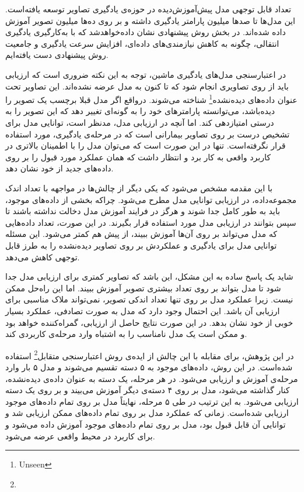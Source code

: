 تعداد قابل توجهی مدل پیش‌آموزش‌دیده در حوزه‌ی یادگیری تصاویر توسعه یافته‌است.
این مدل‌ها  تا صد‌ها میلیون پارامتر یادگیری داشته و بر روی ده‌ها میلیون تصویر آموزش داده شده‌اند. 
در بخش روش پیشنهادی نشان داده‌خواهد‌شد که با به‌کارگیری یادگیری انتقالی، چگونه به کاهش نیازمندی‌های داده‌ای، افزایش سرعت یادگیری و جامعیت روش پیشنهادی دست یافته‌ایم.


در اعتبار‌سنجی مدل‌های یادگیری ماشین، توجه به این نکته ضروری است که ارزیابی باید از روی تصاویری انجام شود که تا کنون به مدل عرضه نشده‌اند.
این تصاویر تحت عنوان داده‌های
 دیده‌نشده\footnote{Unseen}
 شناخته می‌شوند.
درواقع
اگر مدل قبلا برچسب یک تصویر را دیده‌باشد، می‌توانسته پارامتر‌های خود را به گونه‌ای تغییر دهد که این تصویر را به درستی امتیازدهی کند.
اما آنچه در ارزیابی مدل، مدنظر است، توانایی مدل برای تشخیص درست بر روی تصاویر بیمارانی است که در مرحله‌ی یادگیری، مورد استفاده قرار نگرفته‌است.
تنها در این صورت است که می‌توان مدل را با اطمینان بالاتری در کاربرد واقعی به کار برد و انتظار داشت که همان عملکرد مورد قبول را بر روی داده‌های جدید از خود نشان دهد.

با این مقدمه مشخص می‌شود که
یکی دیگر از چالش‌ها در مواجهه با تعداد اندک مجموعه‌داده، در ارزیابی توانایی مدل مطرح می‌شود.
چراکه بخشی از داده‌های موجود، باید به طور کامل جدا شوند و هرگز در فرایند آموزش مدل دخالت نداشته باشند تا سپس بتوانند در ارزیابی مدل مورد استفاده قرار بگیرند.
در این صورت، تعداد داده‌هایی که مدل می‌تواند بر روی آن‌ها آموزش ببیند، از پیش هم کمتر می‌شود.
این مسئله توانایی مدل برای یادگیری و عملکردش بر روی تصاویر دیده‌نشده را به طرز قابل توجهی کاهش می‌دهد.

شاید یک پاسخ ساده به این مشکل، این باشد که تصاویر کمتری برای ارزیابی مدل جدا شود تا مدل بتواند بر روی تعداد بیشتری تصویر آموزش ببیند.
اما این راه‌حل ممکن نیست.
زیرا عملکرد مدل بر روی تنها تعداد اندکی تصویر، نمی‌تواند ملاک مناسبی برای ارزیابی آن باشد.
این احتمال وجود دارد که مدل به صورت تصادفی، عملکرد بسیار خوبی از خود نشان بدهد.
در این صورت نتایج حاصل از ارزیابی،‌ گمراه‌کننده خواهد بود و ممکن است یک مدل نامناسب را به اشتباه وارد مرحله‌ی کاربردی کند.

در این پژوهش، برای مقابله با این چالش از ایده‌ی روش
اعتبارسنجی متقابل\footnote{}
استفاده شده‌است.
در این روش،
داده‌های موجود به ۵ دسته تقسیم می‌شوند و مدل ۵ بار وارد مرحله‌ی آموزش و ارزیابی می‌شود.
در هر مرحله، یک دسته به عنوان داده‌ی دیده‌نشده، کنار گذاشته می‌شود، مدل بر روی ۴ دسته‌ی دیگر آموزش می‌بیند و بر روی یک دسته ارزیابی می‌شود. 
به این ترتیب در طی ۵ مرحله، نهایتاً مدل بر روی تمام داده‌های موجود ارزیابی شده‌است.
زمانی که عملکرد مدل بر روی تمام داده‌های ممکن ارزیابی شد و توانایی آن قابل قبول بود، مدل بر روی تمام داده‌های موجود آموزش داده‌ می‌شود و برای کاربرد در محیط واقعی عرضه می‌شود.

